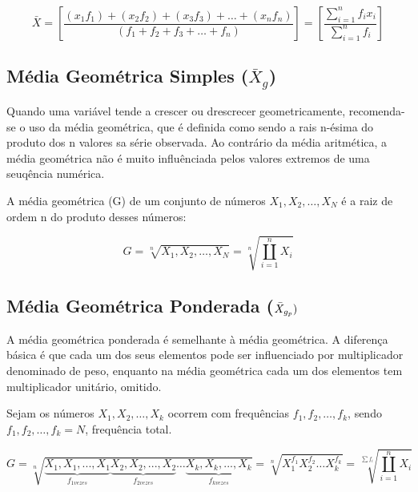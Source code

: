 \begin{equation}\label{media2}
     \bar{X}= \left[ \frac{(x_{1}f_{1}) + (x_{2}f_{2}) + (x_{3}f_{3})+
 \ldots + (x_{n}f_{n})}{(f_{1}+f_{2}+f_{3}+\ldots+f_{n})} \right ]=   \left[\frac{\sum_{i=1}^{n}f_{i}x_{i}}{\sum_{i=1}^{n}f_{i}} \right ]
\end{equation}


\subsection{Média Geométrica Simples ($\bar{X}_{g}$)}

Quando uma variável tende a crescer ou drescrecer geometricamente, recomenda-se o uso da média geométrica, que é definida como sendo a rais n-ésima do produto dos n valores sa série observada. Ao contrário da média aritmética, a média geométrica não é muito influênciada pelos valores extremos de uma seuqência numérica.\vskip0.3cm


A média geométrica (G) de um conjunto de números $X_{1},X_{2},\ldots,X_{N}$ é a raiz de ordem n do produto
desses números:

\begin{equation}\label{Geometrica}
    G=\sqrt[n]{X_{1},X_{2},\ldots,X_{N}}=\sqrt[n]{\coprod_{i=1}^{n}X_{i}}
\end{equation}


\subsection{Média Geométrica Ponderada ($\Bar{X}_{g_{p}})$}

A média geométrica ponderada é semelhante à média geométrica. A diferença básica é que cada um dos seus elementos pode ser influenciado por multiplicador denominado de peso, enquanto na média geométrica cada um dos elementos tem multiplicador unitário, omitido.\vskip0.3cm


Sejam os números $X_{1},X_{2},\ldots,X_{k}$ ocorrem com frequências $f_{1},f_{2},\ldots,f_{k}$, sendo $f_{1},f_{2},\ldots,f_{k}=N$, frequência total.


\begin{equation}\label{Geometrica}
    G=\sqrt[n]{\underbrace{X_{1},X_{1},...,X_{1}}_{f_{1vezes}}\underbrace{X_{2},X_{2},...,X_{2}}_{f_{2vezes}} \ldots \underbrace{X_{k},X_{k},...,X_{k}}_{f_{kvezes}}}=\sqrt[n]{X_{1}^{f_{1}}X_{2}^{f_{2}}\ldots X_{k}^{f_{k}}}
 = \sqrt[\sum f_{i}]{\coprod_{i=1}^{n}X_{i}}
\end{equation}

